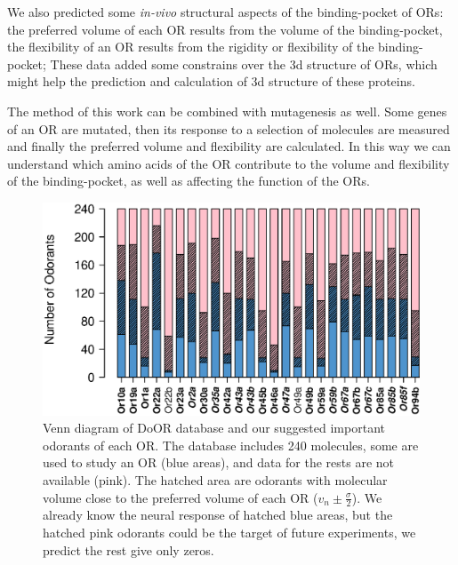 \documentclass[11pt]{paper} %
\begin{document}

We also predicted some {\it in-vivo} structural aspects of  the binding-pocket of ORs:
the preferred volume of each OR results from the volume of the binding-pocket,
the flexibility of an OR results from the rigidity or flexibility of the binding-pocket; 
These data added some constrains over the 3d structure of ORs, 
which might help the prediction and calculation of 3d structure of these proteins. 

The method of this work can be combined with mutagenesis as well. 
Some genes of an OR are mutated, 
then its response to a selection of molecules are measured and finally the preferred volume and flexibility are calculated.
In this way we can understand which amino acids of the OR contribute to the volume and flexibility of the binding-pocket, 
as well as affecting the function of the ORs.


\begin{figure}
\centering
	\includegraphics[width=\textwidth]{odorant-suggest}
	\caption{Venn diagram of DoOR database and our suggested important odorants of each OR.
			The database includes 240 molecules, 
			some are used to study an OR (blue areas), 
			and data for the rests are not available (pink).
			The hatched area are odorants with molecular volume close to the preferred volume of each OR
			($v_n \pm \frac{\sigma}{2}$).
			We already know the neural response of hatched blue areas, 
			but the hatched pink odorants could be the target of future experiments, we predict the rest give only zeros.
			}
	\label{fig:odorant-suggest}
\end{figure}
\end{document}
